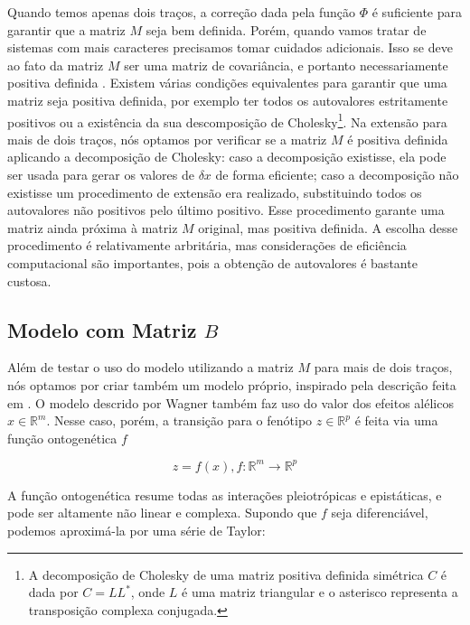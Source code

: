 Quando temos apenas dois traços, a correção dada pela função $\Phi$ é
suficiente para garantir que a matriz $M$ seja bem definida.
Porém, quando vamos tratar de sistemas com mais caracteres precisamos
tomar cuidados adicionais.
Isso se deve ao fato da matriz $M$ ser uma matriz de covariância, e
portanto necessariamente positiva definida \citep{Anderson1984}.
Existem várias condições equivalentes para garantir que uma matriz seja
positiva definida, por exemplo ter todos os autovalores estritamente
positivos ou a existência da sua descomposição de Cholesky\footnote{A
decomposição de Cholesky de uma matriz positiva definida simétrica
$C$ é dada por $C=LL^*$, onde $L$ é uma matriz triangular e o asterisco
representa a transposição complexa conjugada.}.
Na extensão para mais de dois traços, nós optamos por verificar se a
matriz $M$ é positiva definida aplicando a decomposição de Cholesky:
caso a decomposição existisse, ela pode ser usada para gerar os valores
de $\delta x$ de forma eficiente; caso a decomposição não existisse um
procedimento de extensão \citep{Marroig2011b} era realizado,
substituindo todos os autovalores não positivos pelo último positivo.
Esse procedimento garante uma matriz ainda próxima à matriz $M$
original, mas positiva definida.
A escolha desse procedimento é relativamente arbritária, mas
considerações de eficiência computacional são importantes, pois a
obtenção de autovalores é bastante custosa.

\subsection{Modelo com Matriz $B$}\label{cap2:mem:ModelB}

Além de testar o uso do modelo utilizando a matriz $M$ para mais de dois
traços, nós optamos por criar também um modelo próprio, inspirado pela
descrição feita em \cite{Wagner1984}.
O modelo descrido por Wagner também faz uso do valor dos efeitos
alélicos $x \in \mathbb{R}^m$.
Nesse caso, porém, a transição para o fenótipo $z \in \mathbb{R}^p$ é
feita via uma função ontogenética $f$

\begin{equation}
z = f(x), f:\mathbb{R}^m \rightarrow \mathbb{R}^{p}
\end{equation}

A função ontogenética resume todas as interações pleiotrópicas e
epistáticas, e pode ser altamente não linear e complexa.
Supondo que $f$ seja diferenciável, podemos aproximá-la por uma série de
Taylor:

